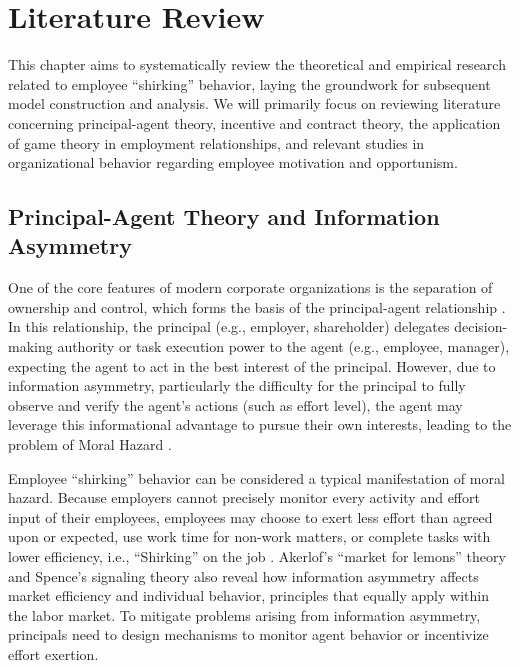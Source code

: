 \chapter{Literature Review}

This chapter aims to systematically review the theoretical and empirical research related to employee \enquote{shirking} behavior, laying the groundwork for subsequent model construction and analysis. We will primarily focus on reviewing literature concerning principal-agent theory, incentive and contract theory, the application of game theory in employment relationships, and relevant studies in organizational behavior regarding employee motivation and opportunism.

\section{Principal-Agent Theory and Information Asymmetry}

One of the core features of modern corporate organizations is the separation of ownership and control, which forms the basis of the principal-agent relationship \citep{jensen1976theory}. In this relationship, the principal (e.g., employer, shareholder) delegates decision-making authority or task execution power to the agent (e.g., employee, manager), expecting the agent to act in the best interest of the principal. However, due to information asymmetry, particularly the difficulty for the principal to fully observe and verify the agent's actions (such as effort level), the agent may leverage this informational advantage to pursue their own interests, leading to the problem of Moral Hazard \citep{holmstrom1979moral}.

Employee \enquote{shirking} behavior can be considered a typical manifestation of moral hazard. Because employers cannot precisely monitor every activity and effort input of their employees, employees may choose to exert less effort than agreed upon or expected, use work time for non-work matters, or complete tasks with lower efficiency, i.e., \enquote{Shirking} on the job \citep{alchian1972production}. Akerlof's \enquote{market for lemons} theory \citep{akerlof1970market} and Spence's signaling theory \citep{spence1973job} also reveal how information asymmetry affects market efficiency and individual behavior, principles that equally apply within the labor market. To mitigate problems arising from information asymmetry, principals need to design mechanisms to monitor agent behavior or incentivize effort exertion.

